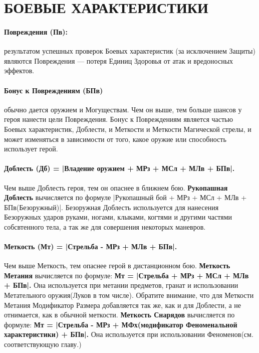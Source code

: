 \section{БОЕВЫЕ ХАРАКТЕРИСТИКИ}
\paragraph{Повреждения (Пв):} результатом успешных проверок Боевых характеристик (за исключением Защиты) являются Повреждения — потеря Единиц Здоровья от атак и вредоносных эффектов.
\paragraph{Бонус к Повреждениям (БПв)} обычно дается оружием и Могуществам. Чем он выше, тем больше шансов у героя нанести цели Повреждения. Бонус к Повреждениям является частью Боевых характеристик, Доблести, и Меткости и Меткости Магической стрелы, и может изменяться в зависимости от того, какое оружие или способность использует герой.
\paragraph{Доблесть (Дб) = |Владение оружием + МРз + МСл + МЛв + БПв|.} Чем выше Доблесть героя, тем он опаснее в ближнем бою.
\newline \textbf{Рукопашная Доблесть} вычисляется по формуле |Рукопашный бой + МРз + МСл + МЛв + БПв(Безоружный)|. Безоружная Доблесть используется для нанесения Безоружных ударов руками, ногами, клыками, когтями и другими частями собсвтенного тела, а так же для совершения некоторых маневров.
\paragraph{Меткость (Мт) = |Стрельба - МРз + МЛв + БПв|.} Чем выше Меткость, тем опаснее герой в дистанционном бою.
\newline \textbf{Меткость Метания} вычисляется по формуле: \textbf{Мт = |Стрельба + МРз + МСл + МЛв + БПв|.} Она используется при метании предметов, гранат и использовании Метательного оружия(Луков в том числе). Обратите внимание, что для Меткости Метания Модификатор Размера добавляется так же, как и для Доблести, а не отнимается, как в обычной меткости.
\newline \textbf{Меткость Снарядов} вычисляется по формуле: \textbf{Мт = |Стрельба - МРз + МФх(модификатор Феноменальной характеристики) + БПв|.} Она используется при использовании Феноменов(см. соответствующую главу.)
